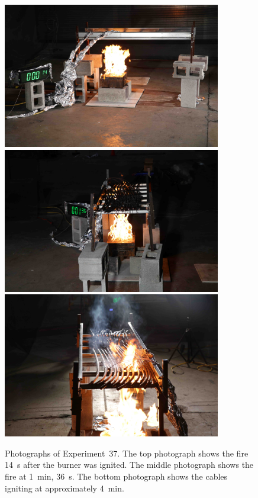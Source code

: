 \begin{figure}[p]
\centering
\includegraphics[height=2.50in]{../FIGURES/Test_37_side} \\
\includegraphics[height=2.50in]{../FIGURES/Test_37_1_min_36_s} \\
\includegraphics[height=2.50in]{../FIGURES/Test_37_ignition}
\caption[Photographs of Experiment~37]{Photographs of Experiment~37. The top photograph shows the fire 14~s after the burner was ignited. The middle photograph shows the fire at 1~min, 36~s. The bottom photograph shows the cables igniting at approximately 4~min.}
\label{fig:Test_37_photos}
\end{figure}


\clearpage


